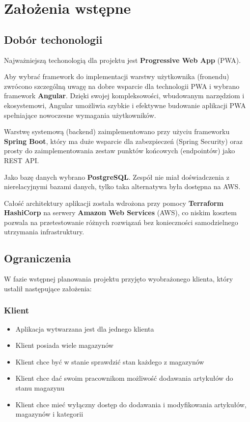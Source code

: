 \documentclass[../main.tex]{subfiles}
\begin{document}
\section{Założenia wstępne}
    \subsection{Dobór techonologii}
        Najważniejszą techonologią dla projektu jest \textbf{Progressive Web App} (PWA). 
        
        Aby wybrać framework do implementacji warstwy użytkownika (fronendu) zwrócono szczególną uwagę na dobre wsparcie dla technologii PWA i wybrano framework \textbf{Angular}. Dzięki swojej kompleksowości, wbudowanym narzędziom i ekosystemowi, Angular umożliwia szybkie i efektywne budowanie aplikacji PWA spełniające nowoczesne wymagania użytkowników.

        Warstwę systemową (backend) zaimplementowano przy użyciu frameworku \textbf{Spring Boot}, który ma duże wsparcie dla zabezpieczeń (Spring Security) oraz prosty do zaimplementowania zestaw punktów końcowych (endpointów) jako REST API.

        Jako bazę danych wybrano \textbf{PostgreSQL}. Zespół nie miał doświadczenia z nierelacyjnymi bazami danych, tylko taka alternatywa była dostępna na AWS.

        Całość architektury aplikacji została wdrożona przy pomocy \textbf{Terraform HashiCorp} na serwery \textbf{Amazon Web Services} (AWS), co niskim kosztem pozwala na przetestowanie różnych rozwiązań bez konieczności samodzielnego utrzymania infrastruktury.
    \subsection{Ograniczenia}
        W fazie wstępnej planowania projektu przyjęto wyobrażonego klienta, który ustalił następujące założenia:
        \subsubsection*{Klient}
            \begin{itemize}
                \item Aplikacja wytwarzana jest dla jednego klienta
                \item Klient posiada wiele magazynów
                \item Klient chce być w stanie sprawdzić stan każdego z magazynów
                \item Klient chce dać swoim pracownikom możliwość dodawania artykułów do stanu magazynu
                \item Klient chce mieć wyłączny dostęp do dodawania i modyfikowania artykułów, magazynów i kategorii
            \end{itemize} 
\end{document}
